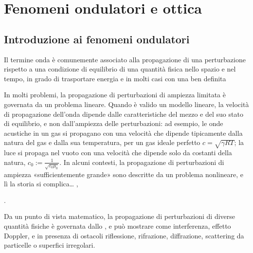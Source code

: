 \documentclass[letterpaper,10pt,italian]{jupyterBook}
\begin{document}
\part{Fenomeni ondulatori e ottica}

\sphinxstepscope


\chapter{Introduzione ai fenomeni ondulatori}
\label{\detokenize{ch/waves/intro:introduzione-ai-fenomeni-ondulatori}}\label{\detokenize{ch/waves/intro:physics-hs-waves-intro}}\label{\detokenize{ch/waves/intro::doc}}
\sphinxAtStartPar
{} Il termine onda è comunemente associato alla propagazione di una perturbazione \sphinxhyphen{} rispetto a una condizione di equilibrio \sphinxhyphen{} di una quantità fisica nello spazio e nel tempo, in grado di trasportare energia e in molti casi con una  ben definita%
\begin{footnote}[1]\sphinxAtStartFootnote
In molti problemi, la propagazione di perturbazioni di ampiezza limitata è governata da un problema lineare. Quando è valido un modello lineare, la velocità di propagazione dell’onda dipende dalle caratteristiche del mezzo e del suo stato di equilibrio, e non dall’ampiezza delle perturbazioni: ad esempio, le onde acustiche in un gas si propagano con una velocità che dipende tipicamente dalla natura del gas e dalla sua temperatura, per un gas ideale perfetto \(c = \sqrt{\gamma R T}\); la luce si propaga nel vuoto con una velocità che dipende solo da costanti della natura, \(c_0 := \frac{1}{\sqrt{\varepsilon_0 \mu_0}}\). In alcuni contesti, la propagazione di perturbazioni di ampiezza «sufficientemente grande» sono descritte da un problema non\sphinxhyphen{}lineare, e lì la storia si complica…  , 
%
\end{footnote}.

\sphinxAtStartPar
Da un punto di vista matematico, la propagazione di perturbazioni di diverse quantità fisiche è governata dallo , e può mostrare  come interferenza, effetto Doppler, e \sphinxhyphen{} in presenza di ostacoli \sphinxhyphen{} riflessione, rifrazione, diffrazione, scattering da particelle o superfici irregolari.
\end{document}
